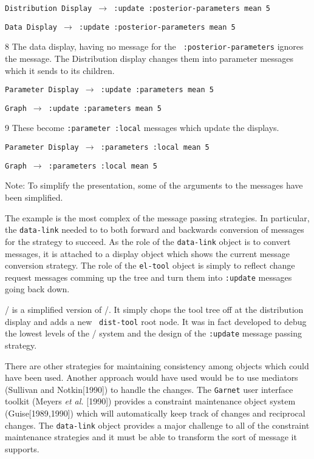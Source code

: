 {\tt Distribution Display $\rightarrow$ :update :posterior-parameters mean 5}\par
{\tt Data Display $\rightarrow$ :update :posterior-parameters mean 5}\par

\item{8}  The data display, having no message for the {\tt
:posterior-parameters\/} ignores the message.  The Distribution display
changes them into parameter messages which it sends to its children.

{\tt Parameter Display $\rightarrow$ :update :parameters mean 5}\par
{\tt Graph $\rightarrow$ :update :parameters mean 5}\par

\item{9} These become {\tt :parameter :local\/} messages which update
the displays.

{\tt Parameter Display $\rightarrow$ :parameters :local mean 5}\par
{\tt Graph $\rightarrow$ :parameters :local mean 5}\par 

Note:  To simplify the presentation, some of the arguments to the
messages have been simplified.

\endgroup

The example is the most complex of the message passing strategies.  In
particular, the {\tt data-link\/} needed to to both forward and
backwards conversion of messages for the strategy to succeed.  As the
role of the {\tt data-link\/} object is to convert messages, it is
attached to a display object which shows the current message
conversion strategy.  The role of the {\tt el-tool\/} object is simply
to reflect change request messages comming up the tree and turn them
into {\tt :update\/} messages going back down.

\disttoy/ is a simplified version of \eltoy/.  It simply chops the
tool tree off at the distribution display and adds a new {\tt
dist-tool\/} root node.  It was in fact developed to debug the lowest
levels of the \eltoy/ system and the design of the {\tt :update\/}
message passing strategy. 

There are other strategies for maintaining consistency among objects
which could have been used.  Another approach would have used would be
to use mediators (Sullivan and Notkin[1990]) to handle the changes.
The {\tt Garnet\/} user interface toolkit (Meyers {\it et al.\/}
[1990]) provides a constraint maintenance object system (Guise[1989,1990])
which will automatically keep track of changes and reciprocal changes.
The {\tt data-link\/} object provides a major challenge to all of the
constraint maintenance strategies and it must be able to transform the
sort of message it supports.

